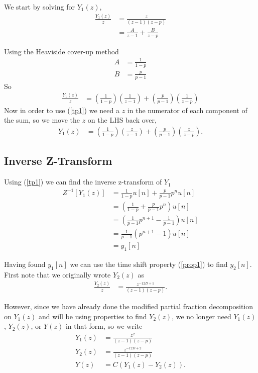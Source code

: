 \documentclass[letterpaper]{article}
\begin{document}
We start by solving for $Y_1(z)$,
\begin{align}
	\frac{Y_1(z)}{z} &= \frac{z}{(z-1)(z - p)} \\
					 &= \frac{A}{z-1} + \frac{B}{z-p}
\end{align}

Using the Heaviside cover-up method
\begin{align}
	A &= \frac{1}{1 - p} \\
	B &= \frac{p}{p - 1}
\end{align}
So
\begin{align}
	\frac{Y_1(z)}{z} &= \left(\frac{1}{1 - p}\right)\left(\frac{1}{z-1}\right) 
						+ \left(\frac{p}{p - 1}\right)\left(\frac{1}{z-p}\right) 
\end{align}
Now in order to use (\ref{tp1}) we need a $z$ in the numerator of each component of the sum, so we move the $z$ on the LHS back over,
\begin{align}
	Y_1(z) &= \left(\frac{1}{1 - p}\right)\left(\frac{z}{z-1}\right) 
	+ \left(\frac{p}{p - 1}\right)\left(\frac{z}{z-p}\right).
\end{align}

\pagebreak
\subsection{Inverse Z-Transform}
Using (\ref{tp1}) we can find the inverse z-transform of $Y_1$
\begin{align}
	Z^{-1}\left[Y_1(z)\right] &= \frac{1}{1 - p}u[n] + \frac{p}{p - 1}p^n u[n] \\
							  &= \left(\frac{1}{1 - p} + \frac{p}{p - 1}p^n \right)u[n] \\
							  &= \left(\frac{1}{p - 1}p^{n+1} - \frac{1}{p - 1} \right)u[n] \\
							  &= \frac{1}{p - 1}\left(p^{n+1} - 1 \right)u[n] \\
							  &= y_1[n]
\end{align}

Having found $y_1[n]$ we can use the time shift property (\ref{prop1}) to find $y_2[n]$. First note that we originally wrote $Y_2(z)$ as
\begin{align}
	\frac{Y_2(z)}{z} &= \frac{z^{-12D+1}}{(z-1)(z - p)}.
\end{align}

However, since we have already done the modified partial fraction decomposition on $Y_1(z)$ and will be using properties to find $Y_2(z)$, we no longer need $Y_1(z)$, $Y_2(z)$, or $Y(z)$ in that form, so we write
\begin{align}
	Y_1(z) &= \frac{z^2}{(z-1)(z - p)} \\
	Y_2(z) &= \frac{z^{-12D+2}}{(z-1)(z - p)} \\
	Y(z)   &= C \left(Y_1(z) - Y_2(z) \right).
\end{align}
\end{document}
